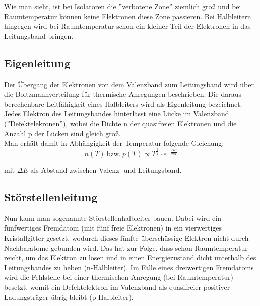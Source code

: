 \documentclass{article}
\begin{document}
Wie man sieht, ist bei Isolatoren die ''verbotene Zone'' ziemlich groß und bei Raumtemperatur können keine Elektronen diese Zone passieren. Bei Halbleitern hingegen wird bei Raumtemperatur schon ein kleiner Teil der Elektronen in das Leitungsband bringen.

\subsection{Eigenleitung}
Der Übergang der Elektronen von dem Valenzband zum Leitungsband wird über die Boltzmannverteilung für thermische Anregungen beschrieben. Die daraus berechenbare Leitfähigkeit eines Halbleiters wird als Eigenleitung bezeichnet. Jedes Elektron des Leitungsbandes hinterlässt eine Lücke im Valenzband (''Defektelekronen''), wobei die Dichte n der quasifreien Elektronen und die Anzahl p der Lücken sind gleich groß.\\
Man erhält damit in Abhängigkeit der Temperatur folgende Gleichung:
\begin{equation}
n(T)\ \text{bzw.}\ p(T) \propto T^{\frac{3}{2}}\cdot e^{-\frac{\Delta E}{2kT}}
\end{equation}

mit \(\Delta E\) als Abstand zwischen Valenz- und Leitungsband.

\subsection{Störstellenleitung}
Nun kann man sogenannte Störstellenhalbleiter bauen. Dabei wird ein fünfwertiges Fremdatom (mit fünf freie Elektronen) in ein vierwertiges Kristallgitter gesetzt, wodurch dieses fünfte überschüssige Elektron nicht durch Nachbaratome gebunden wird. Das hat zur Folge, dass schon Raumtemperatur reicht, um das Elektron zu lösen und in einen Energiezustand dicht unterhalb des Leitungsbandes zu heben (n-Halbleiter). Im Falle eines dreiwertigen Fremdatoms wird die Fehlstelle bei einer thermischen Anregung (bei Raumtemperatur) besetzt, womit ein Defektelektron im Valenzband als quasifreier positiver Ladungsträger übrig bleibt (p-Halbleiter).
\end{document}
